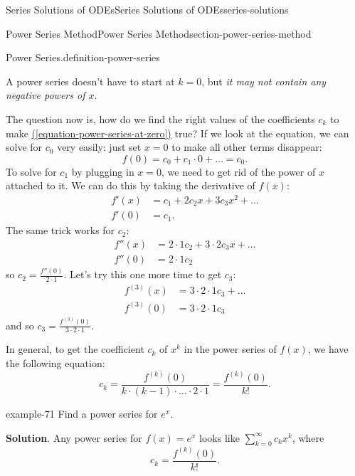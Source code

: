\documentclass[oneside,10pt,]{book}
\numberwithin{equation}{section}
\newcommand{\amp}{&}
\begin{document}
\begin{chapterptx}{Series Solutions of ODEs}{}{Series Solutions of ODEs}{}{}{series-solutions}
\begin{sectionptx}{Power Series Method}{}{Power Series Method}{}{}{section-power-series-method}
\begin{definition}{Power Series.}{definition-power-series}
\end{definition}
\hypertarget{p-427}{}%
A power series doesn't have to start at \(k=0\), but \emph{it may not contain any negative powers of \(x\)}.%
\par
\hypertarget{p-428}{}%
The question now is, how do we find the right values of the coefficients \(c_{k}\) to make \hyperref[equation-power-series-at-zero]{(\ref{equation-power-series-at-zero})} true? If we look at the equation, we can solve for \(c_{0}\) very easily: just set \(x=0\) to make all other terms disappear:%
\begin{equation*}
f(0) = c_{0} + c_{1}\cdot0+\dots = c_{0}.
\end{equation*}
To solve for \(c_{1}\) by plugging in \(x=0\), we need to get rid of the power of \(x\) attached to it. We can do this by taking the derivative of \(f(x)\):%
\begin{align*}
f'(x) \amp= c_{1} + 2c_{2}x + 3c_{3}x^{2} + \dots\\
f'(0) \amp= c_{1}\text{.}
\end{align*}
The same trick works for \(c_{2}\):%
\begin{align*}
f''(x) \amp= 2\cdot1c_{2} + 3\cdot2c_{3}x+\dots\\
f''(0) \amp= 2\cdot1c_{2}
\end{align*}
so \(c_{2} = \frac{f''(0)}{2\cdot1}\). Let's try this one more time to get \(c_{3}\):%
\begin{align*}
f^{(3)}(x) \amp= 3\cdot2\cdot1c_{3} + \dots\\
f^{(3)}(0) \amp= 3\cdot2\cdot1c_{3}
\end{align*}
and so \(c_{3} = \frac{f^{(3)}(0)}{3\cdot2\cdot1}\).%
\par
\hypertarget{p-429}{}%
In general, to get the coefficient \(c_{k}\) of \(x^{k}\) in the power series of \(f(x)\), we have the following equation:%
%
\begin{equation}
c_{k} = \frac{f^{(k)}(0)}{k\cdot(k-1)\cdot\dots\cdot2\cdot1} = \frac{f^{(k)}(0)}{k!}.\label{equation-power-series-coefficients-at-zero}
\end{equation}
\begin{example}{}{example-71}%
\hypertarget{p-430}{}%
Find a power series for \(e^{x}\).%
\par\smallskip%
\noindent\textbf{Solution}.\hypertarget{solution-68}{}\quad%
\hypertarget{p-431}{}%
Any power series for \(f(x) = e^{x}\) looks like \(\sum_{k=0}^{\infty}c_{k}x^{k}\), where%
\begin{equation*}
c_{k} = \frac{f^{(k)}(0)}{k!}.

\end{equation*}
\end{example}
\end{sectionptx}
\end{chapterptx}
\end{document}
